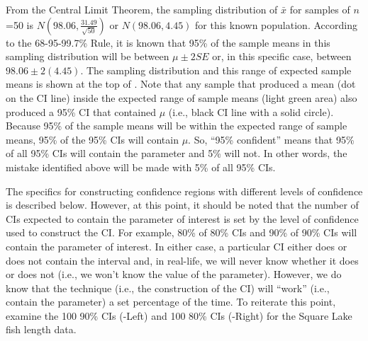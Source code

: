 \documentclass[10pt,openany]{book}\usepackage[]{graphicx}\usepackage[]{color}
\begin{document}
\vspace*{-12pt}
From the Central Limit Theorem, the sampling distribution of $\bar{x}$ for samples of $n$=50 is $N(98.06,\frac{31.49}{\sqrt{50}})$ or $N(98.06,4.45)$ for this known population. According to the 68-95-99.7\% Rule, it is known that 95\% of the sample means in this sampling distribution will be between $\mu\pm2SE$ or, in this specific case, between $98.06\pm2(4.45)$. The sampling distribution and this range of expected sample means is shown at the top of . Note that any sample that produced a mean (dot on the CI line) inside the expected range of sample means (light green area) also produced a 95\% CI that contained $\mu$ (i.e., black CI line with a solid circle). Because 95\% of the sample means will be within the expected range of sample means, 95\% of the 95\% CIs will contain $\mu$. So, ``95\% confident'' means that 95\% of all 95\% CIs will contain the parameter and 5\% will not. In other words, the mistake identified above will be made with 5\% of all 95\% CIs.

The specifics for constructing confidence regions with different levels of confidence is described below. However, at this point, it should be noted that the number of CIs expected to contain the parameter of interest is set by the level of confidence used to construct the CI. For example, 80\% of 80\% CIs and 90\% of 90\% CIs will contain the parameter of interest. In either case, a particular CI either does or does not contain the interval and, in real-life, we will never know whether it does or does not (i.e., we won't know the value of the parameter). However, we do know that the technique (i.e., the construction of the CI) will ``work'' (i.e., contain the parameter) a set percentage of the time. To reiterate this point, examine the 100 90\% CIs (-Left) and 100 80\% CIs (-Right) for the Square Lake fish length data.
\end{document}
